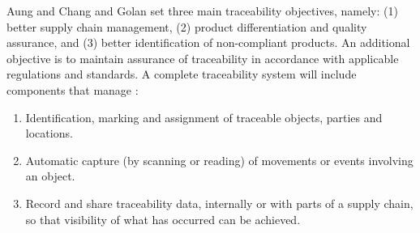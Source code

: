 Aung and Chang \cite{aung2014traceability} and Golan \cite{golan2004traceability} set three main traceability objectives, namely: (1) better supply chain management, (2) product differentiation and quality assurance, and (3) better identification of non-compliant products. An additional objective is to maintain assurance of traceability in accordance with applicable regulations and standards. A complete traceability system will include components that manage \cite{vargas2017trazabilidad}:

\begin{enumerate}
\item Identification, marking and assignment of traceable objects, parties and locations.
\item Automatic capture (by scanning or reading) of movements or events involving an object.
\item Record and share traceability data, internally or with parts of a supply chain, so that visibility of what has occurred can be achieved.
\end{enumerate}